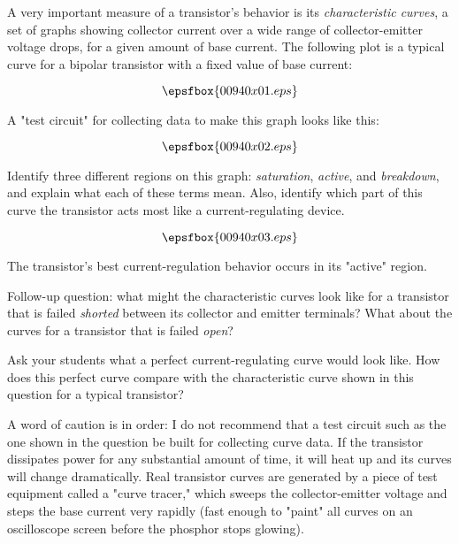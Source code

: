 

A very important measure of a transistor's behavior is its {\it characteristic curves}, a set of graphs showing collector current over a wide range of collector-emitter voltage drops, for a given amount of base current.  The following plot is a typical curve for a bipolar transistor with a fixed value of base current:

$$\epsfbox{00940x01.eps}$$

A "test circuit" for collecting data to make this graph looks like this:

$$\epsfbox{00940x02.eps}$$

Identify three different regions on this graph: {\it saturation}, {\it active}, and {\it breakdown}, and explain what each of these terms mean.  Also, identify which part of this curve the transistor acts most like a current-regulating device.







$$\epsfbox{00940x03.eps}$$

The transistor's best current-regulation behavior occurs in its "active" region.

\vskip 10pt

Follow-up question: what might the characteristic curves look like for a transistor that is failed {\it shorted} between its collector and emitter terminals?  What about the curves for a transistor that is failed {\it open}?







Ask your students what a perfect current-regulating curve would look like.  How does this perfect curve compare with the characteristic curve shown in this question for a typical transistor?

A word of caution is in order: I do not recommend that a test circuit such as the one shown in the question be built for collecting curve data.  If the transistor dissipates power for any substantial amount of time, it will heat up and its curves will change dramatically.  Real transistor curves are generated by a piece of test equipment called a "curve tracer," which sweeps the collector-emitter voltage and steps the base current very rapidly (fast enough to "paint" all curves on an oscilloscope screen before the phosphor stops glowing).





